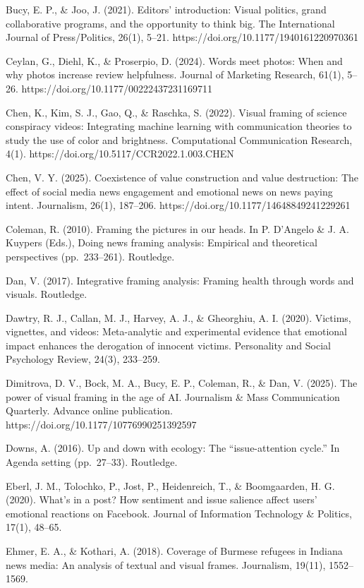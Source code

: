 \documentclass[
]{article}
\begin{document}
Bucy, E. P., \& Joo, J. (2021). Editors' introduction: Visual politics,
grand collaborative programs, and the opportunity to think big. The
International Journal of Press/Politics, 26(1), 5--21.
https://doi.org/10.1177/1940161220970361

Ceylan, G., Diehl, K., \& Proserpio, D. (2024). Words meet photos: When
and why photos increase review helpfulness. Journal of Marketing
Research, 61(1), 5--26. https://doi.org/10.1177/00222437231169711

Chen, K., Kim, S. J., Gao, Q., \& Raschka, S. (2022). Visual framing of
science conspiracy videos: Integrating machine learning with
communication theories to study the use of color and brightness.
Computational Communication Research, 4(1).
https://doi.org/10.5117/CCR2022.1.003.CHEN

Chen, V. Y. (2025). Coexistence of value construction and value
destruction: The effect of social media news engagement and emotional
news on news paying intent. Journalism, 26(1), 187--206.
https://doi.org/10.1177/14648849241229261

Coleman, R. (2010). Framing the pictures in our heads. In P. D'Angelo \&
J. A. Kuypers (Eds.), Doing news framing analysis: Empirical and
theoretical perspectives (pp.~233--261). Routledge.

Dan, V. (2017). Integrative framing analysis: Framing health through
words and visuals. Routledge.

Dawtry, R. J., Callan, M. J., Harvey, A. J., \& Gheorghiu, A. I. (2020).
Victims, vignettes, and videos: Meta-analytic and experimental evidence
that emotional impact enhances the derogation of innocent victims.
Personality and Social Psychology Review, 24(3), 233--259.

Dimitrova, D. V., Bock, M. A., Bucy, E. P., Coleman, R., \& Dan, V.
(2025). The power of visual framing in the age of AI. Journalism \& Mass
Communication Quarterly. Advance online publication.
https://doi.org/10.1177/10776990251392597

Downs, A. (2016). Up and down with ecology: The ``issue-attention
cycle.'' In Agenda setting (pp.~27--33). Routledge.

Eberl, J. M., Tolochko, P., Jost, P., Heidenreich, T., \& Boomgaarden,
H. G. (2020). What's in a post? How sentiment and issue salience affect
users' emotional reactions on Facebook. Journal of Information
Technology \& Politics, 17(1), 48--65.

Ehmer, E. A., \& Kothari, A. (2018). Coverage of Burmese refugees in
Indiana news media: An analysis of textual and visual frames.
Journalism, 19(11), 1552--1569.
\end{document}
